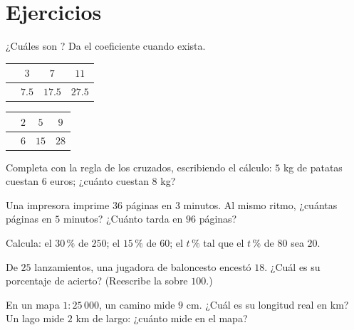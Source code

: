 \section{Ejercicios}

\begin{exercise}[$\star$]\label{exo:g7:prop:1}
¿Cuáles son ? Da el coeficiente cuando
exista.
\begin{center}
\renewcommand{\arraystretch}{1.2}
\begin{tabular}{l|ccc}
 & $3$ & $7$ & $11$ \\
\hline
 & $7.5$ & $17.5$ & $27.5$ \\
\end{tabular}
\qquad
\begin{tabular}{l|ccc}
 & $2$ & $5$ & $9$ \\
\hline
 & $6$ & $15$ & $28$ \\
\end{tabular}
\end{center}
\end{exercise}

\begin{exercise}[$\star$]\label{exo:g7:prop:2}
Completa con la regla de los  cruzados, escribiendo el cálculo:
$5$ kg de patatas cuestan $6$ euros; ¿cuánto cuestan $8$ kg?
\end{exercise}

\begin{exercise}[$\star$]\label{exo:g7:prop:3}
Una impresora imprime $36$ páginas en $3$ minutos. Al mismo ritmo, ¿cuántas
páginas en $5$ minutos? ¿Cuánto tarda en $96$ páginas?
\end{exercise}

\begin{exercise}[$\star$]\label{exo:g7:prop:4}
Calcula: el $30\,\%$ de $250$; \quad el $15\,\%$ de $60$; \quad el $t\,\%$ tal
que el $t\,\%$ de $80$ sea $20$.
\end{exercise}

\begin{exercise}[$\star$]\label{exo:g7:prop:5}
De $25$ lanzamientos, una jugadora de baloncesto encestó $18$. ¿Cuál es su
porcentaje de acierto? (Reescribe la  sobre $100$.)
\end{exercise}

\begin{exercise}[$\star$]\label{exo:g7:prop:6}
En un mapa $1 : 25\,000$, un camino mide $9$ cm. ¿Cuál es su longitud
real en km? Un lago mide $2$ km de largo: ¿cuánto mide en el mapa?
\end{exercise}


